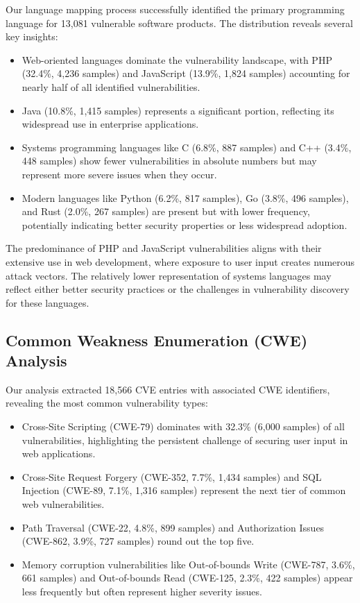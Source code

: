 Our language mapping process successfully identified the primary programming language for 13,081 vulnerable software products. The distribution reveals several key insights:

\begin{itemize}
    \item Web-oriented languages dominate the vulnerability landscape, with PHP (32.4\%, 4,236 samples) and JavaScript (13.9\%, 1,824 samples) accounting for nearly half of all identified vulnerabilities.
    \item Java (10.8\%, 1,415 samples) represents a significant portion, reflecting its widespread use in enterprise applications.
    \item Systems programming languages like C (6.8\%, 887 samples) and C++ (3.4\%, 448 samples) show fewer vulnerabilities in absolute numbers but may represent more severe issues when they occur.
    \item Modern languages like Python (6.2\%, 817 samples), Go (3.8\%, 496 samples), and Rust (2.0\%, 267 samples) are present but with lower frequency, potentially indicating better security properties or less widespread adoption.
\end{itemize}

The predominance of PHP and JavaScript vulnerabilities aligns with their extensive use in web development, where exposure to user input creates numerous attack vectors. The relatively lower representation of systems languages may reflect either better security practices or the challenges in vulnerability discovery for these languages.

\subsection{Common Weakness Enumeration (CWE) Analysis}

Our analysis extracted 18,566 CVE entries with associated CWE identifiers, revealing the most common vulnerability types:

\begin{itemize}
    \item Cross-Site Scripting (CWE-79) dominates with 32.3\% (6,000 samples) of all vulnerabilities, highlighting the persistent challenge of securing user input in web applications.
    \item Cross-Site Request Forgery (CWE-352, 7.7\%, 1,434 samples) and SQL Injection (CWE-89, 7.1\%, 1,316 samples) represent the next tier of common web vulnerabilities.
    \item Path Traversal (CWE-22, 4.8\%, 899 samples) and Authorization Issues (CWE-862, 3.9\%, 727 samples) round out the top five.
    \item Memory corruption vulnerabilities like Out-of-bounds Write (CWE-787, 3.6\%, 661 samples) and Out-of-bounds Read (CWE-125, 2.3\%, 422 samples) appear less frequently but often represent higher severity issues.
\end{itemize}

